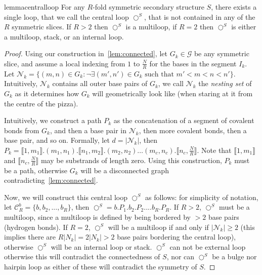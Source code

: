 \begin{restatable}{lemma}{centralloop} 
	\label{lem:centralloop}
	For any $R$-fold symmetric secondary structure $S$, there exists a single loop, that we call the central loop $\bigcirc^S$, that is not contained in any of the $R$ symmetric slices. 
	If $R>2$ then $\bigcirc^S$ is a multiloop, if $R=2$ then $\bigcirc^S$ is either a multiloop, stack, or an internal loop.   
\end{restatable}
\begin{proof}
	Using our construction in~\cref{lem:connected}, 
	let   
	$G_k \in \mathcal{G}$ be any symmetric slice, and 
	assume a local indexing from $1$ to $\frac{N}{R}$ for the bases in the segment $I_k$. Let $\mathcal{N}_k = \{(m,n) \in G_k: \neg\exists (m',n') \in G_k \textrm{ such that } m'<m<n<n'\}$. Intuitively,  $\mathcal{N}_k$ contains all outer base pairs of $G_k$, we call  $\mathcal{N}_k$ the \emph{nesting set} of $G_k$ as it determines how $G_k$ will geometrically look like (when staring at it from the centre of the pizza). 
	
	Intuitively, we construct a path $P_k$ as the concatenation of a segment of covalent bonds from $G_k$, and then a base pair in $\mathcal{N}_k$, then more covalent bonds, then a base pair, and so on.  Formally, let $d = |\mathcal{N}_k|$, then  $P_k = \llbracket 1,m_1 \rrbracket. (m_1,n_1). \llbracket n_1,m_2 \rrbracket.  (m_2,n_2) \ldots (m_c,n_c). \llbracket n_c,\frac{N}{R} \rrbracket$. Note that $\llbracket 1,m_1 \rrbracket$ and $\llbracket n_c,\frac{N}{R} \rrbracket$ may be substrands of length zero. Using this construction, $P_k$ must be a path, otherwise $G_k$ will be a disconnected graph contradicting~\cref{lem:connected}.
	
	Now, we will construct this central loop $\bigcirc^S$ as follows: for simplicity of notation, let $\mathcal{C}_R^b = \{ b, b_2, ..., b_R\}$, then 
	$\bigcirc^S = b. P_1. b_2. P_2. ... b_R. P_R$. If $R > 2$, $\bigcirc^S$ must be a multiloop, since a multiloop is defined by being bordered by $>2$ base pairs (hydrogen bonds). 
	If $R = 2$, $\bigcirc^S$ will be a multiloop if and only if $|\mathcal{N}_k| \geq 2$ (this implies there are $R |N_k| = 2|N_k|  > 2 $ base pairs bordering the central loop), 
	otherwise $\bigcirc^S$ will be an internal loop or stack. $\bigcirc^S$ can not be external loop otherwise this will contradict the connectedness of $S$, nor can $\bigcirc^S$  be a bulge nor hairpin loop as either of these  will contradict the  symmetry of $S$. 
\end{proof}



